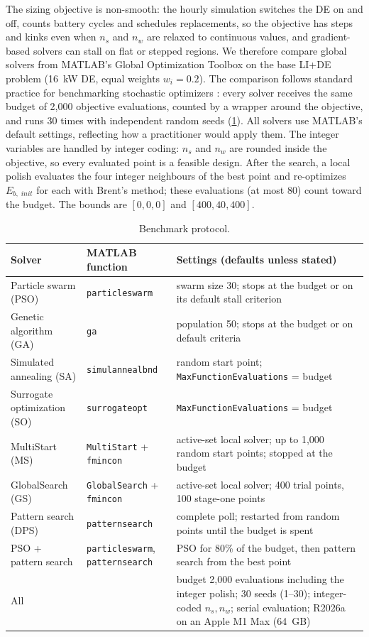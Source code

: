 \documentclass[final,3p,times]{elsarticle}
\begin{document}
The sizing objective is non-smooth: the hourly simulation switches the DE on and off, counts battery cycles and schedules replacements, so the objective has steps and kinks even when $n_s$ and $n_w$ are relaxed to continuous values, and gradient-based solvers can stall on flat or stepped regions. We therefore compare global solvers from MATLAB's Global Optimization Toolbox on the base LI+DE problem (16~kW DE, equal weights $w_i = 0.2$). The comparison follows standard practice for benchmarking stochastic optimizers \cite{hansen2021coco, derrac2011tutorial}: every solver receives the same budget of 2,000 objective evaluations, counted by a wrapper around the objective, and runs 30 times with independent random seeds (\cref{tab:protocol}). All solvers use MATLAB's default settings, reflecting how a practitioner would apply them. The integer variables are handled by integer coding: $n_s$ and $n_w$ are rounded inside the objective, so every evaluated point is a feasible design. After the search, a local polish evaluates the four integer neighbours of the best point and re-optimizes $E_{b,\;init}$ for each with Brent's method; these evaluations (at most 80) count toward the budget. The bounds are $[0, 0, 0]$ and $[400, 40, 400]$.

\begin{table}[htbp]
\centering
\scriptsize
\begin{tabular}{p{2.6cm} p{2.3cm} p{7.4cm}}
\toprule
\textbf{Solver} & \textbf{MATLAB function} & \textbf{Settings (defaults unless stated)} \\
\midrule
Particle swarm (PSO) & \texttt{particleswarm} & swarm size 30; stops at the budget or on its default stall criterion \\
Genetic algorithm (GA) & \texttt{ga} & population 50; stops at the budget or on default criteria \\
Simulated annealing (SA) & \texttt{simulannealbnd} & random start point; \texttt{MaxFunctionEvaluations} = budget \\
Surrogate optimization (SO) & \texttt{surrogateopt} & \texttt{MaxFunctionEvaluations} = budget \\
MultiStart (MS) & \texttt{MultiStart} + \texttt{fmincon} & active-set local solver; up to 1,000 random start points; stopped at the budget \\
GlobalSearch (GS) & \texttt{GlobalSearch} + \texttt{fmincon} & active-set local solver; 400 trial points, 100 stage-one points \\
Pattern search (DPS) & \texttt{patternsearch} & complete poll; restarted from random points until the budget is spent \\
PSO + pattern search & \texttt{particleswarm}, \texttt{patternsearch} & PSO for 80\% of the budget, then pattern search from the best point \\
\midrule
All & & budget 2,000 evaluations including the integer polish; 30 seeds (1--30); integer-coded $n_s, n_w$; serial evaluation; R2026a on an Apple M1 Max (64~GB) \\
\bottomrule
\end{tabular}
\caption{\label{tab:protocol} Benchmark protocol.}
\end{table}
\end{document}
